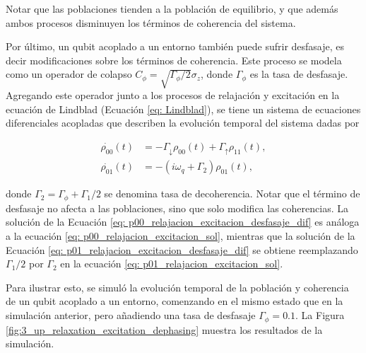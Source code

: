 Notar que las poblaciones tienden a la población de equilibrio, y que además ambos procesos disminuyen los términos de coherencia del sistema.

Por último, un qubit acoplado a un entorno también puede sufrir desfasaje, es decir modificaciones sobre los términos de coherencia. Este proceso se modela como un operador de colapso \(C_\phi = \sqrt{\Gamma_\phi/2} \sigma_z\), donde \(\Gamma_\phi\) es la tasa de desfasaje. Agregando este operador junto a los procesos de relajación y excitación en la ecuación de Lindblad (Ecuación \ref{eq: Lindblad}), se tiene un sistema de ecuaciones diferenciales acopladas que describen la evolución temporal del sistema dadas por

\begin{align}
    \dot{\rho_{00}}(t) &= -\Gamma_\downarrow \rho_{00}(t) + \Gamma_\uparrow \rho_{11}(t), \label{eq: p00_relajacion_excitacion_desfasaje_dif} \\
    \dot{\rho_{01}}(t) &= -\left(i \omega_q + \Gamma_2 \right) \rho_{01}(t), \label{eq: p01_relajacion_excitacion_desfasaje_dif}
\end{align}

\noindent donde \(\Gamma_2 = \Gamma_\phi + \Gamma_1/2\) se denomina tasa de decoherencia. Notar que el término de desfasaje no afecta a las poblaciones, sino que solo modifica las coherencias. La solución de la Ecuación \ref{eq: p00_relajacion_excitacion_desfasaje_dif} es análoga a la ecuación \ref{eq: p00_relajacion_excitacion_sol}, mientras que la solución de la Ecuación \ref{eq: p01_relajacion_excitacion_desfasaje_dif} se obtiene reemplazando \(\Gamma_1/2\) por \(\Gamma_2\) en la ecuación \ref{eq: p01_relajacion_excitacion_sol}.

Para ilustrar esto, se simuló la evolución temporal de la población y coherencia de un qubit acoplado a un entorno, comenzando en el mismo estado que en la simulación anterior, pero añadiendo una tasa de desfasaje \(\Gamma_\phi = 0.1\). La Figura \ref{fig:3_up_relaxation_excitation_dephasing} muestra los resultados de la simulación.


